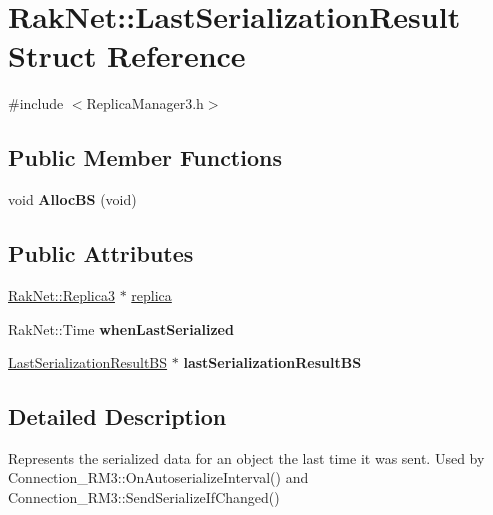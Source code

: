 \hypertarget{struct_rak_net_1_1_last_serialization_result}{\section{Rak\-Net\-:\-:Last\-Serialization\-Result Struct Reference}
\label{struct_rak_net_1_1_last_serialization_result}
}


{\ttfamily \#include $<$Replica\-Manager3.\-h$>$}

\subsection*{Public Member Functions}
\begin{DoxyCompactItemize}
\item 
\hypertarget{struct_rak_net_1_1_last_serialization_result_a685b9acd1abbef8600ff1be14515fe86}{void {\bfseries Alloc\-B\-S} (void)}\label{struct_rak_net_1_1_last_serialization_result_a685b9acd1abbef8600ff1be14515fe86}

\end{DoxyCompactItemize}
\subsection*{Public Attributes}
\begin{DoxyCompactItemize}
\item 
\hyperlink{class_rak_net_1_1_replica3}{Rak\-Net\-::\-Replica3} $\ast$ \hyperlink{struct_rak_net_1_1_last_serialization_result_acef6e348bfcacf510597437f53fcde97}{replica}
\item 
\hypertarget{struct_rak_net_1_1_last_serialization_result_a960937a3d1808e222d111e2dbb1e0253}{Rak\-Net\-::\-Time {\bfseries when\-Last\-Serialized}}\label{struct_rak_net_1_1_last_serialization_result_a960937a3d1808e222d111e2dbb1e0253}

\item 
\hypertarget{struct_rak_net_1_1_last_serialization_result_a969665b4e07a4f4b5bc4377250d07cf7}{\hyperlink{struct_rak_net_1_1_last_serialization_result_b_s}{Last\-Serialization\-Result\-B\-S} $\ast$ {\bfseries last\-Serialization\-Result\-B\-S}}\label{struct_rak_net_1_1_last_serialization_result_a969665b4e07a4f4b5bc4377250d07cf7}

\end{DoxyCompactItemize}


\subsection{Detailed Description}
Represents the serialized data for an object the last time it was sent. Used by Connection\-\_\-\-R\-M3\-::\-On\-Autoserialize\-Interval() and Connection\-\_\-\-R\-M3\-::\-Send\-Serialize\-If\-Changed() 

